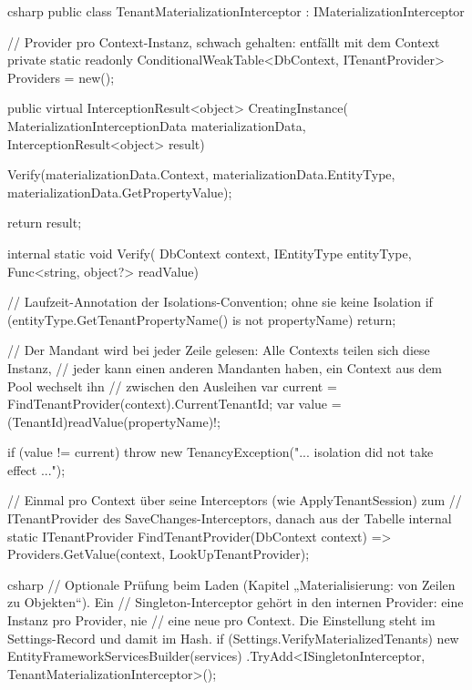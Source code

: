 \begin{sourcecode}{csharp}
public class TenantMaterializationInterceptor : IMaterializationInterceptor
{
    // Provider pro Context-Instanz, schwach gehalten: entfällt mit dem Context
    private static readonly ConditionalWeakTable<DbContext, ITenantProvider> Providers =
        new();

    public virtual InterceptionResult<object> CreatingInstance(
        MaterializationInterceptionData materializationData,
        InterceptionResult<object> result)
    {
        Verify(materializationData.Context, materializationData.EntityType,
            materializationData.GetPropertyValue);

        return result;
    }

    internal static void Verify(
        DbContext context, IEntityType entityType, Func<string, object?> readValue)
    {
        // Laufzeit-Annotation der Isolations-Convention; ohne sie keine Isolation
        if (entityType.GetTenantPropertyName() is not { } propertyName)
            return;

        // Der Mandant wird bei jeder Zeile gelesen: Alle Contexts teilen sich diese Instanz,
        // jeder kann einen anderen Mandanten haben, ein Context aus dem Pool wechselt ihn
        // zwischen den Ausleihen
        var current = FindTenantProvider(context).CurrentTenantId;
        var value = (TenantId)readValue(propertyName)!;

        if (value != current)
            throw new TenancyException("... isolation did not take effect ...");
    }

    // Einmal pro Context über seine Interceptors (wie ApplyTenantSession) zum
    // ITenantProvider des SaveChanges-Interceptors, danach aus der Tabelle
    internal static ITenantProvider FindTenantProvider(DbContext context)
        => Providers.GetValue(context, LookUpTenantProvider);
}
\end{sourcecode}

\begin{sourcecode}{csharp}
// Optionale Prüfung beim Laden (Kapitel „Materialisierung: von Zeilen zu Objekten“). Ein
// Singleton-Interceptor gehört in den internen Provider: eine Instanz pro Provider, nie
// eine neue pro Context. Die Einstellung steht im Settings-Record und damit im Hash.
if (Settings.VerifyMaterializedTenants)
    new EntityFrameworkServicesBuilder(services)
        .TryAdd<ISingletonInterceptor, TenantMaterializationInterceptor>();
\end{sourcecode}

